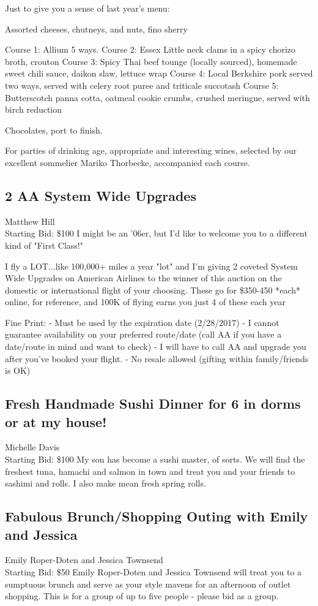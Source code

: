 \documentclass[11pt]{article}
\begin{document}
Just to give you a sense of last year's menu:

Assorted cheeses, chutneys, and nuts, fino sherry

Course 1: Allium 5 ways.  
Course 2: Essex Little neck clams in a spicy chorizo broth, crouton
Course 3: Spicy Thai beef tounge (locally sourced), homemade sweet chili sauce, daikon slaw, lettuce wrap
Course 4: Local Berkshire pork served two ways, served with celery root puree and triticale succotash
Course 5: Butterscotch panna cotta, oatmeal cookie crumbs, crushed meringue, served with birch reduction

Chocolates, port to finish.

For parties of drinking age, appropriate and interesting wines, selected by our excellent sommelier Mariko Thorbecke, accompanied each course.
\subsection{2 AA System Wide Upgrades}
Matthew Hill
\\
Starting Bid: \$100
\newline
I might be an '06er, but I'd like to welcome you to a different kind of "First Class!"

I fly a LOT...like 100,000+ miles a year "lot" and I'm giving 2 coveted System Wide Upgrades on American Airlines to the winner of this auction on the domestic or international flight of your choosing. These go for \$350-450 *each* online, for reference, and 100K of flying earns you just 4 of these each year

Fine Print: 
  - Must be used by the expiration date (2/28/2017)
  - I cannot guarantee availability on your preferred route/date (call AA if you have a date/route in mind and want to check)
  - I will have to call AA and upgrade you after you've booked your flight.
  - No resale allowed (gifting within family/friends is OK)
\subsection{Fresh Handmade Sushi Dinner for 6 in dorms or at my house!}
Michelle Davis
\\
Starting Bid: \$100
\newline
My son has become a sushi master, of sorts. We will find the freshest tuna, hamachi and salmon in town and treat you and your friends to sashimi and rolls. I also make mean fresh spring rolls.
\subsection{Fabulous Brunch/Shopping Outing with Emily and Jessica}
Emily Roper-Doten and Jessica Townsend
\\
Starting Bid: \$50
\newline
Emily Roper-Doten and Jessica Townsend will treat you to a sumptuous brunch and serve as your style mavens for an afternoon of outlet shopping. This is for a group of up to five people - please bid as a group.
\end{document}
